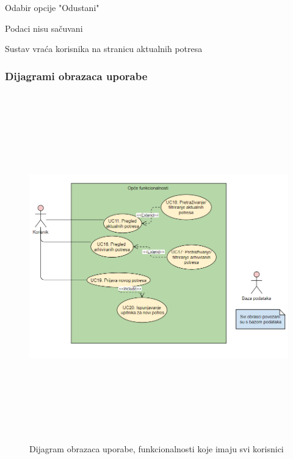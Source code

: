 \begin{packed_item}
\begin{packed_item}
\begin{packed_enum}
					\end{packed_enum}
					
					\item[7.a] Odabir opcije "Odustani"
					\item[] \begin{packed_enum}
						
						\item Podaci nisu sačuvani
						\item Sustav vraća korisnika na stranicu aktualnih potresa
						
					\end{packed_enum}
					
				\end{packed_item}
				
			\end{packed_item}						
					
				\subsubsection{Dijagrami obrazaca uporabe}
					
				\begin{figure}[H]
					\includegraphics[width=\textwidth, height = 15cm]{slike/prvinovi.PNG} 
					 \caption{Dijagram obrazaca uporabe, funkcionalnosti koje imaju svi korisnici}
					  \label{fig:obrasci1} 
				  \end{figure}
				  
